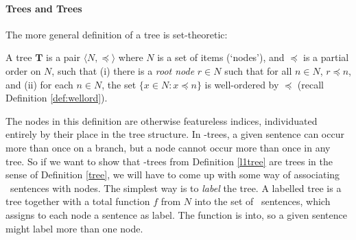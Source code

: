 \paragraph{Trees and Trees} The more general definition of a tree is  set-theoretic: 
\begin{definition}\label{tree}
	A tree $\mathbf{T}$ is a pair $\langle N, \preceq\rangle$ where $N$ is a set of items (`nodes'), and $\preceq$ is a partial order on $N$, such that (i) there is a \emph{root node} $r \in N$ such that for all $n\in N$, $r \preceq n$, and (ii) for each $n \in N$, the set $\{x \in N: x \preceq n\}$ is well-ordered by $\preceq$ (recall Definition \ref{def:wellord}). 
\end{definition} The nodes in this definition are otherwise featureless indices, individuated entirely by their place in the tree structure. In \lone-trees, a given sentence can occur more than once on a branch, but a node cannot occur more than once in any tree. So if we want to show that \lone-trees from Definition \ref{l1tree} are trees in the sense of Definition \ref{tree}, we will have to come up with some way of associating \lone\ sentences with nodes. The simplest way is to \emph{label} the tree. A labelled tree is a tree together with a total function $f$ from $N$ into the set of \lone\ sentences, which assigns to each node a sentence as label. The function is into, so a given sentence might label more than one node.

